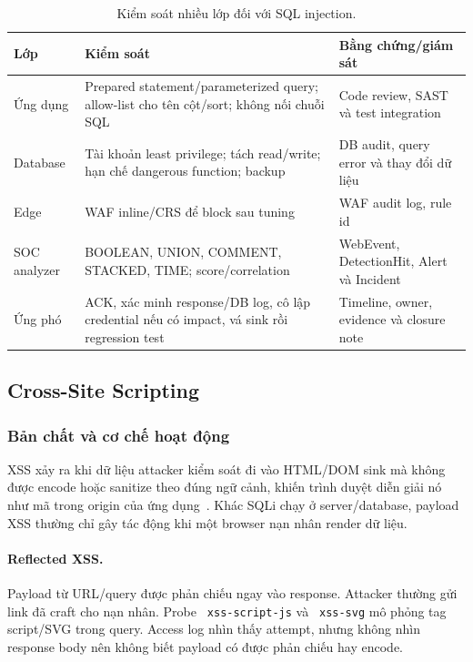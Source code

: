 \documentclass[runningheads]{report-template/llncs}
\newcommand{\code}[1]{\texttt{\small\hyphenchar\font=45 #1}}
\begin{document}
\begin{table}
\caption{Kiểm soát nhiều lớp đối với SQL injection.}
\label{tab:sqli-controls}
\centering\small
\begin{tabularx}{\textwidth}{@{}p{24mm}YY@{}}
\toprule
Lớp & Kiểm soát & Bằng chứng/giám sát\\
\midrule
Ứng dụng & Prepared statement/parameterized query; allow-list cho tên
cột/sort; không nối chuỗi SQL & Code review, SAST và test integration\\
Database & Tài khoản least privilege; tách read/write; hạn chế dangerous
function; backup & DB audit, query error và thay đổi dữ liệu\\
Edge & WAF inline/CRS để block sau tuning & WAF audit log, rule id\\
SOC analyzer & BOOLEAN, UNION, COMMENT, STACKED, TIME; score/correlation &
WebEvent, DetectionHit, Alert và Incident\\
Ứng phó & ACK, xác minh response/DB log, cô lập credential nếu có impact,
vá sink rồi regression test & Timeline, owner, evidence và closure note\\
\bottomrule
\end{tabularx}
\end{table}

\subsection{Cross-Site Scripting}

\subsubsection{Bản chất và cơ chế hoạt động}

XSS xảy ra khi dữ liệu attacker kiểm soát đi vào HTML/DOM sink mà không
được encode hoặc sanitize theo đúng ngữ cảnh, khiến trình duyệt diễn giải
nó như mã trong origin của ứng dụng~\cite{owaspxss}. Khác SQLi chạy ở
server/database, payload XSS thường chỉ gây tác động khi một browser nạn
nhân render dữ liệu.

\paragraph{Reflected XSS.}
Payload từ URL/query được phản chiếu ngay vào response. Attacker thường
gửi link đã craft cho nạn nhân. Probe \code{xss-script-js} và
\code{xss-svg} mô phỏng tag script/SVG trong query. Access log nhìn thấy
attempt, nhưng không nhìn response body nên không biết payload có được
phản chiếu hay encode.
\end{document}
